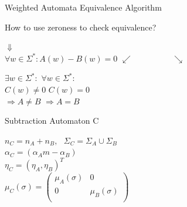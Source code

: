 \documentclass[rgb, pdf]{beamer}
\begin{document}
\begin{frame}{Weighted Automata Equivalence Algorithm~\autocite{Kiefer2013OnTC}}
\begin{minipage}[b][.5\textheight][t]{.25\textwidth}
\begin{center}
    \end{center}
    \end{minipage}\hfill
    \begin{minipage}[b][.5\textheight][t]{.32\textwidth}
    How to use zeroness to check equivalence?
    \begin{center}
     $\Downarrow$ \\
     $\forall w \in \Sigma^*: A(w) - B(w) = 0$
     $\swarrow \hspace{2cm} \searrow$
    \end{center}
    $\exists w \in \Sigma^*:$ \hfill $\forall w \in \Sigma^*:$\\
    $C(w) \neq 0$ \hfill $C(w) = 0$\\
    $\Rightarrow A \neq B$ \hfill $\Rightarrow A = B$
    \end{minipage}\hfill
    \begin{minipage}[b][.5\textheight][t]{.32\textwidth}
    Subtraction Automaton C
    \begin{center}
     $n_C = n_A + n_B, \text{  } \Sigma_C = \Sigma_A \cup \Sigma_B$ \\ \vspace{0.3cm}
     $\alpha_C = (\alpha_Am - \alpha_B)$\\ \vspace{0.3cm}
     $ \eta_C = (\eta_A, \eta_B)^T$ \\ \vspace{0.3cm}
     $\mu_C(\sigma) = \begin{pmatrix}
                                    \mu_A(\sigma) & 0 \\
                                    0 & \mu_B(\sigma) \\
                                \end{pmatrix}$
    \end{center}

    
    
    \end{minipage}%

    \end{frame}
\end{document}
